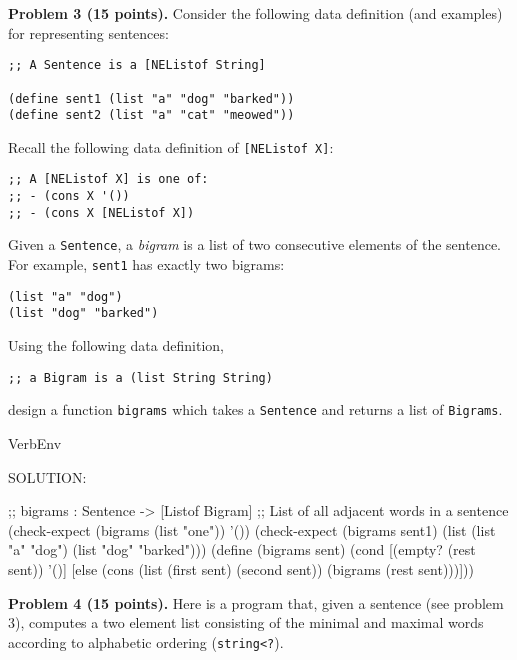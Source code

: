 \documentclass[12pt]{article}
\begin{document}


\newpage

\noindent
{\bf Problem 3 (15 points).}
%
Consider the following data definition (and examples) for representing sentences:
\begin{verbatim}
;; A Sentence is a [NEListof String]

(define sent1 (list "a" "dog" "barked"))
(define sent2 (list "a" "cat" "meowed"))
\end{verbatim}
Recall the following data definition of {\tt [NEListof X]}:
\begin{verbatim}
;; A [NEListof X] is one of:
;; - (cons X '())
;; - (cons X [NEListof X])
\end{verbatim}
Given a {\tt Sentence}, a \emph{bigram} is a list of two consecutive
elements of the sentence. For example, {\tt sent1} has exactly two
bigrams:
\begin{verbatim}
(list "a" "dog")
(list "dog" "barked")
\end{verbatim}
Using the following data definition,
\begin{verbatim}
;; a Bigram is a (list String String)
\end{verbatim}
design a function {\tt bigrams} which takes a {\tt Sentence} and
returns a list of {\tt Bigrams}.

\begin{SaveVerbatim}{VerbEnv}


SOLUTION:

;; bigrams : Sentence -> [Listof Bigram]
;; List of all adjacent words in a sentence
(check-expect (bigrams (list "one")) '())
(check-expect (bigrams sent1)
              (list (list "a" "dog") (list "dog" "barked")))
(define (bigrams sent)
  (cond [(empty? (rest sent)) '()]
        [else
         (cons (list (first sent) (second sent))
               (bigrams (rest sent)))]))
\end{SaveVerbatim}



\newpage

\noindent
{\bf Problem 4 (15 points).}
%
Here is a program that, given a sentence (see problem 3), computes a
two element list consisting of the minimal and maximal words according
to alphabetic ordering ({\tt string<?}).
\end{document}
